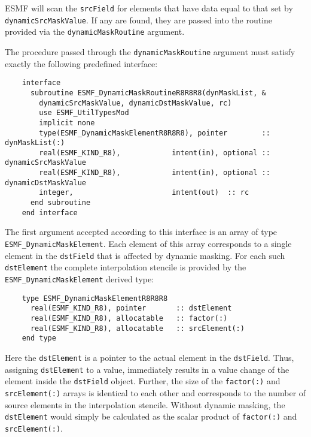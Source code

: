 
   ESMF will scan the {\tt srcField} for elements that have data equal to
   that set by {\tt dynamicSrcMaskValue}. If any are found, they
   are passed into the routine provided via the {\tt dynamicMaskRoutine}
   argument. 

   The procedure passed through the {\tt dynamicMaskRoutine} argument must 
   satisfy exactly the following predefined interface:
  
   \begin{verbatim}
    interface
      subroutine ESMF_DynamicMaskRoutineR8R8R8(dynMaskList, &
        dynamicSrcMaskValue, dynamicDstMaskValue, rc)
        use ESMF_UtilTypesMod
        implicit none
        type(ESMF_DynamicMaskElementR8R8R8), pointer        :: dynMaskList(:)
        real(ESMF_KIND_R8),            intent(in), optional :: dynamicSrcMaskValue
        real(ESMF_KIND_R8),            intent(in), optional :: dynamicDstMaskValue
        integer,                       intent(out)  :: rc
      end subroutine
    end interface
   \end{verbatim}
  
   The first argument accepted according to this interface is an array of type
   {\tt ESMF\_DynamicMaskElement}. Each element of this array corresponds to a
   single element in the {\tt dstField} that is affected by dynamic masking. 
   For each such {\tt dstElement} the complete interpolation stencile is
   provided by the {\tt ESMF\_DynamicMaskElement} derived type:
  
   \begin{verbatim}
    type ESMF_DynamicMaskElementR8R8R8
      real(ESMF_KIND_R8), pointer       :: dstElement
      real(ESMF_KIND_R8), allocatable   :: factor(:)
      real(ESMF_KIND_R8), allocatable   :: srcElement(:)
    end type
   \end{verbatim}
  
   Here the {\tt dstElement} is a pointer to the actual element in the 
   {\tt dstField}. Thus, assigning {\tt dstElement} to a value, immediately
   results in a value change of the element inside the {\tt dstField} object.
   Further, the size of the {\tt factor(:)} and {\tt srcElement(:)} arrays is
   identical to each other and corresponds to the number of source elements in
   the interpolation stencile. Without dynamic masking, the {\tt dstElement}
   would simply be calculated as the scalar product of {\tt factor(:)} and 
   {\tt srcElement(:)}.
  
